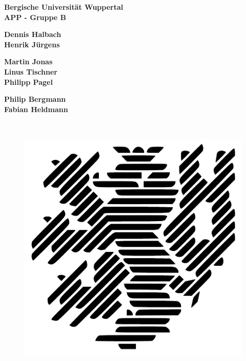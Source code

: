 \documentclass[12pt,a4paper]{article}
\begin{document}

	
	\begin{titlepage}
		\begin{center}
			\textbf{\huge Bergische Universität Wuppertal \\[1cm] APP - Gruppe B
			}\\[0.8cm]
			
		\begin{minipage}{0.327\textwidth}
			\centering
			\textbf{\large Dennis Halbach}\\
		    \textbf{\large Henrik Jürgens}\\
		\end{minipage}
		\begin{minipage}{0.327\textwidth}
			\centering
			\textbf{\large Martin Jonas}\\
			\textbf{\large Linus Tischner}\\
			\textbf{\large Philipp Pagel}\\
		\end{minipage}
		\begin{minipage}{0.327\textwidth}
			\centering
			\textbf{\large Philip Bergmann}\\
			\textbf{\large Fabian Heldmann} \\
		\end{minipage}\\[0.5cm]

		\begin{figure}[H]
			\centering
			\includegraphics[scale=0.3]{uni-logo.pdf}
		\end{figure}


\end{center}
\end{titlepage}
\end{document}
